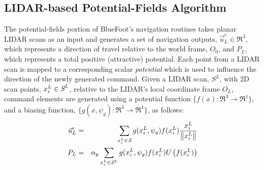 		\subsection{LIDAR-based Potential-Fields Algorithm}

			The potential-fields portion of BlueFoot's navigation routines takes planar LIDAR scans as an input and generates a set of navigation outputs, $\vec{u}^{r}_{L} \in \Re^{3}$, which represents a direction of travel relative to the world frame, $O_{0}$, and $P_{L}$, which represents a total positive (attractive) potential. Each point from a LIDAR scan is mapped to a corresponding scalar \emph{potential} which is used to influence the direction of the newly generated command. Given a LIDAR scan, $S^{L}$, with 2D scan points, $x_{i}^{L}\in\emph{S}^{L}$, relative to the LIDAR's local coordinate frame $O_{L}$, command elements are generated using a potential function $\{ f(x) : \Re^{3}\rightarrow \Re^{1} \}$, and a biasing function, $\{ g(x,\psi_{g}) : \Re^{3}\rightarrow \Re^{1} \}$, as follows:
				\begin{eqnarray}
					\vec{u}^{r}_{L} &=&  { \sum_{x_{i}^{L} \in \emph{S}} g( x_{i}^{L},\psi_{g})  f( x_{i}^{L} ) \frac{x_{i}^{L}}{\left\lVert x_{i}^{L}\right\rVert} } \nonumber \\
					P_{L} & = & \alpha_{p}\sum_{x_{i}^{L} \in \emph{S}^{L}} g( x_{i}^{L},\psi_{g})  f( x_{i}^{L} ) U\left(f( x_{i}^{L} )\right)
					\label{eq::full_potential_fields}
				\end{eqnarray}

